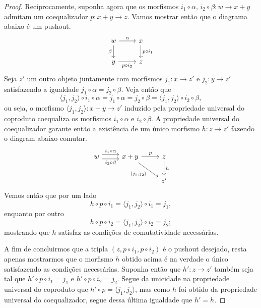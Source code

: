 \begin{proof}
    Reciprocamente, suponha agora que os morfismos $i_1 \circ \alpha,\, i_2 \circ \beta: w \to x+y$ admitam um coequalizador $p: x+y \to z$.
    Vamos mostrar então que o diagrama abaixo é um pushout.
    \begin{displaymath}
        \begin{tikzcd}
            w
            \arrow[r, "\alpha"]
            \arrow[d, "\beta" swap]
            & x
            \arrow[d, "p \circ i_1"]
            \\ y
            \arrow[r, "p \circ i_2" swap]
            & z
        \end{tikzcd}
    \end{displaymath}
    Seja $z'$ um outro objeto juntamente com morfismos $j_1: x \to z'$ e $j_2: y \to z'$ satisfazendo a igualdade $j_1 \circ \alpha = j_2 \circ \beta$.
    Veja então que
    \begin{displaymath}
      \langle j_1,j_2 \rangle \circ i_1 \circ \alpha = j_1 \circ \alpha = j_2 \circ \beta = \langle j_1,j_2 \rangle \circ i_2 \circ \beta,
    \end{displaymath}
    ou seja, o morfismo $\langle j_1, j_2 \rangle: x+y \to z'$ induzido pela propriedade universal do coproduto coequaliza os morfismos $i_1 \circ \alpha$ e $i_2 \circ \beta$.
    A propriedade universal do coequalizador garante então a existência de um único morfismo $h: z \to z'$ fazendo o diagram abaixo comutar.
    \begin{displaymath}
        \begin{tikzcd}
            w
            \arrow[r, shift left=1.25, "i_1 \circ \alpha"]
            \arrow[r, shift right=1.25, "i_2 \circ \beta" swap]
            & x+y
            \arrow[r, "p"]
            \arrow[rd, "{\langle j_1,j_2 \rangle}" swap]
            & z
            \arrow[d, dashed, "h"]
            \\ & & z'
        \end{tikzcd}
    \end{displaymath}
    Vemos então que por um lado
    \begin{displaymath}
        h \circ p \circ i_1
        = \langle j_1,j_2 \rangle \circ i_1
        = j_1,
    \end{displaymath}
    enquanto por outro
    \begin{displaymath}
      h \circ p \circ i_2
      = \langle j_1,j_2 \rangle \circ i_2
      = j_2;
    \end{displaymath}
    mostrando que $h$ satisfaz as condições de comutatividade necessárias.

    A fim de concluirmos que a tripla $(z,p \circ i_1, p \circ i_2)$ é o pushout desejado, resta apenas mostrarmos que o morfismo $h$ obtido acima é na verdade o único satisfazendo as condições necessárias.
    Suponha então que $h': z \to z'$ também seja tal que $h' \circ p \circ i_1 = j_1$ e $h' \circ p \circ i_2 = j_2$.
    Segue da unicidade na propriedade universal do coproduto que $h' \circ p = \langle j_1,j_2 \rangle$, mas como $h$ foi obtido da propriedade universal do coequalizador, segue dessa última igualdade que $h'=h$.
\end{proof}

